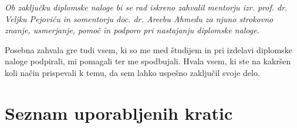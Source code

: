 \documentclass[a4paper, 12pt, openany]{book}
\newcommand{\clearemptydoublepage}{\newpage{\pagestyle{empty}\cleardoublepage}}
\begin{document}
\vfill



\vspace{2cm}

\clearemptydoublepage

\thispagestyle{empty}\mbox{}\vfill\null\it%
\noindent
Ob zaključku diplomske naloge bi se rad iskreno zahvalil mentorju izr. prof. dr. Veljku Pejoviću in somentorju doc. dr. Areebu Ahmedu za njuno strokovno znanje, usmerjanje, pomoč in podporo pri nastajanju diplomske naloge.

Posebna zahvala gre tudi vsem, ki so me med študijem in pri izdelavi diplomske naloge podpirali, mi pomagali ter me spodbujali. Hvala vsem, ki ste na kakršen koli način prispevali k temu, da sem lahko uspešno zaključil svoje delo.
\rm\normalfont

\clearemptydoublepage




\pagestyle{empty}
\def\thepage{}%
\tableofcontents{}


\clearemptydoublepage


\chapter*{Seznam uporabljenih kratic}  %
\end{document}

